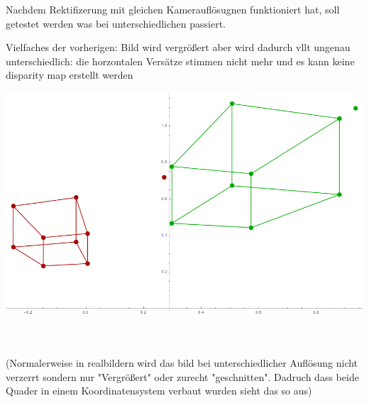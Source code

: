 Nachdem Rektifizerung mit gleichen Kamerauflösugnen funktioniert hat, soll getestet werden was bei unterschiedlichen passiert.


Vielfaches der vorherigen: Bild wird vergrößert aber wird dadurch vllt ungenau\\

unterschiedlich: die horzontalen Versätze stimmen nicht mehr und es kann keine disparity map erstellt werden \\



\begin{minipage}{\linewidth}
	\centering
	\includegraphics[width=1.\linewidth]{images/Rectification_one_different_Solutions.png}
\end{minipage}\\ \\

(Normalerweise in realbildern wird das bild bei unterschiedlicher Auflösung nicht verzerrt sondern nur "Vergrößert" oder zurecht "geschnitten". Dadruch dass beide Quader in einem Koordinatensystem verbaut wurden sieht das so aus)


